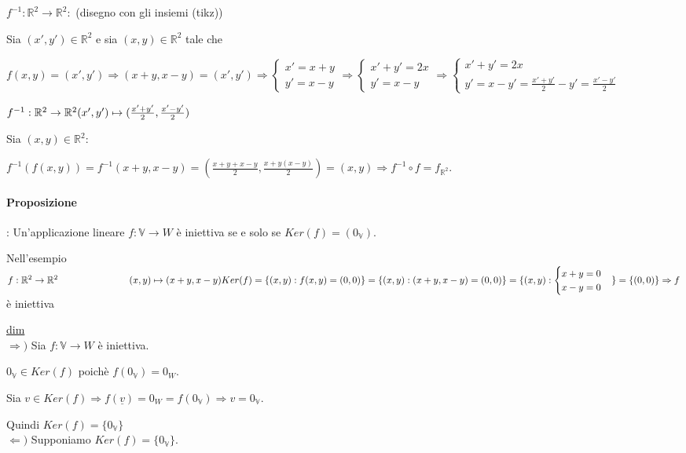 \documentclass{article}
\newcommand{\ul}[1]{\underline{#1}}
\newcommand{\R}{\mathbb{R}}
\newcommand{\V}{\mathbb{V}}
\begin{document}
$f^{-1}:\R^2\rightarrow\R^2:$
(disegno con gli insiemi (tikz))

Sia $(x',y')\in\R^2$ e sia $(x,y)\in\R^2$ tale che

$f(x,y)=(x',y')\Rightarrow(x+y,x-y)=(x',y')\Rightarrow\begin{cases}
	x'=x+y \\
	y'=x-y
	\end{cases}\Rightarrow\begin{cases}
	x'+y'=2x \\
	y'=x-y
	\end{cases}\Rightarrow\begin{cases}
	x'+y'=2x \\
	y'=x-y'=\frac{x'+y'}{2}-y'=\frac{x'-y'}{2}
\end{cases}$

$f^{-1}:\R^2\rightarrow\R^2\\(x',y')\mapsto(\frac{x'+y'}{2},\frac{x'-y'}{2})$

Sia $(x,y)\in\R^2:$

$f^{-1}(f(x,y))=f^{-1}(x+y,x-y)=(\frac{x+y+x-y}{2},\frac{x+y(x-y)}{2})=(x,y)\Rightarrow f^{-1}\circ f=f_{\R^2}$.

\paragraph{Proposizione}: Un'applicazione lineare $f:\V\rightarrow W$ è iniettiva se e solo se $Ker(f)=(0_\V)$.

Nell'esempio $f:\R^2\rightarrow\R^2\\\hspace*{7.5em}(x,y)\mapsto(x+y,x-y)\\Ker(f)=\{(x,y):f(x,y)=(0,0)\}=\{(x,y):(x+y,x-y)=(0,0)\}=\{(x,y):\begin{cases}x+y=0\\x-y=0\end{cases}\}=\{(0,0)\}\Rightarrow f$ è iniettiva

\ul{dim}\\

$\Rightarrow)$ Sia $f:\V\rightarrow W$ è iniettiva.

$0_\V\in Ker(f)$ poichè $f(0_\V)=0_W$.

Sia $v\in Ker(f)\Rightarrow f(\ul{v})=0_W=f(0_\V)\Rightarrow v=0_\V$.

Quindi $Ker(f)=\{0_\V\}$\\

$\Leftarrow)$ Supponiamo $Ker(f)=\{0_\V\}$.
\end{document}
